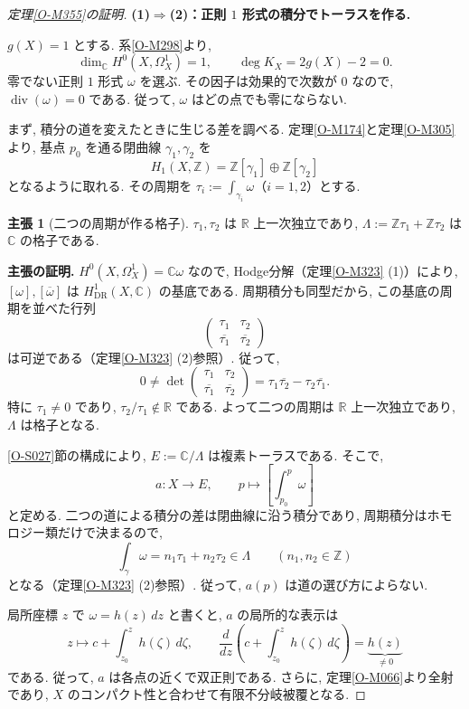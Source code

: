 \documentclass[dvipdfmx,a4paper,11pt]{article} %
\newcommand{\R}{\mathbb{R}}
\newcommand{\Z}{\mathbb{Z}}
\newcommand{\C}{\mathbb{C}}
\theoremstyle{definition}
\numberwithin{equation}{section}
\newtheorem{claim}[thm]{主張}
\begin{document}
\begin{proof}[定理\ref{O-M355}の証明]
\textbf{(1)$\Rightarrow$(2)：正則 $1$ 形式の積分でトーラスを作る.}

$g(X)=1$ とする.
系\ref{O-M298}より,
\[
\dim_{\C}H^0(X,\Omega_X^1)=1,\qquad
\deg K_X=2g(X)-2=0.
\]
零でない正則 $1$ 形式 $\omega$ を選ぶ.
その因子は効果的で次数が $0$ なので,
$\operatorname{div}(\omega)=0$ である.
従って, $\omega$ はどの点でも零にならない.

まず, 積分の道を変えたときに生じる差を調べる.
定理\ref{O-M174}と定理\ref{O-M305}より,
基点 $p_0$ を通る閉曲線 $\gamma_1,\gamma_2$ を
\[
H_1(X,\Z)=\Z[\gamma_1]\oplus\Z[\gamma_2]
\]
となるように取れる.
その周期を
$\tau_i:=\int_{\gamma_i}\omega$（$i=1,2$）とする.

\begin{claim}[二つの周期が作る格子]\label{O-M357}
$\tau_1,\tau_2$ は $\R$ 上一次独立であり,
$\Lambda:=\Z\tau_1+\Z\tau_2$ は $\C$ の格子である.
\end{claim}

\smallskip
\noindent
\textbf{主張の証明.}
$H^0(X,\Omega_X^1)=\C\omega$ なので,
Hodge分解（定理\ref{O-M323} (1)）により,
$[\omega],[\overline\omega]$ は
$H_{\mathrm{DR}}^1(X,\C)$ の基底である.
周期積分も同型だから, この基底の周期を並べた行列
\[
\begin{pmatrix}
\tau_1&\tau_2\\
\overline{\tau_1}&\overline{\tau_2}
\end{pmatrix}
\]
は可逆である（定理\ref{O-M323} (2)参照）.
従って,
\[
0\neq
\det
\begin{pmatrix}
\tau_1&\tau_2\\
\overline{\tau_1}&\overline{\tau_2}
\end{pmatrix}
=\tau_1\overline{\tau_2}-\tau_2\overline{\tau_1}.
\]
特に $\tau_1\neq0$ であり, $\tau_2/\tau_1\notin\R$ である.
よって二つの周期は $\R$ 上一次独立であり,
$\Lambda$ は格子となる.

\medskip
\ref{O-S027}節の構成により, $E:=\C/\Lambda$ は複素トーラスである.
そこで,
\[
a:X\longrightarrow E,\qquad
p\longmapsto\left[\int_{p_0}^{p}\omega\right]
\]
と定める.
二つの道による積分の差は閉曲線に沿う積分であり,
周期積分はホモロジー類だけで決まるので,
\[
\int_{\gamma}\omega
=n_1\tau_1+n_2\tau_2\in\Lambda
\qquad(n_1,n_2\in\Z)
\]
となる（定理\ref{O-M323} (2)参照）.
従って, $a(p)$ は道の選び方によらない.

局所座標 $z$ で $\omega=h(z)\,dz$ と書くと,
$a$ の局所的な表示は
\[
z\longmapsto c+\int_{z_0}^{z}h(\zeta)\,d\zeta,
\qquad
\frac{d}{dz}\left(c+\int_{z_0}^{z}h(\zeta)\,d\zeta\right)
=\underbrace{h(z)}_{\neq0}
\]
である.
従って, $a$ は各点の近くで双正則である.
さらに, 定理\ref{O-M066}より全射であり,
$X$ のコンパクト性と合わせて有限不分岐被覆となる.



\end{proof}
\end{document}

